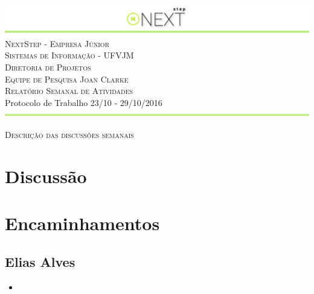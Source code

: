 \documentclass[a4paper, 12pt]{article}
\newcommand\semana{23/10 - 29/10/2016}
\newcommand\equipe{Equipe de Pesquisa Joan Clarke}
\newcommand\projeto{Relatório Semanal de Atividades}
\newcommand\titulo{Protocolo de Trabalho \semana}
\begin{document}
\begin{titlepage}

\begin{center}
\includegraphics[width=\linewidth]{../../images/next_step_logo.png} \\[0.8cm]
\textsc{\LARGE NextStep - Empresa Júnior} \\[0.2cm]
\textsc{\LARGE Sistemas de Informação - UFVJM} \\[0.2cm]
\textsc{\LARGE Diretoria de Projetos} \\[0.2cm]
\textsc{\equipe} \\[1.3cm]
\vfill
\textsc{\LARGE \projeto} \\[0.8cm]
\vfill
\vfill
{\LARGE \titulo \\[0.4cm]}
\includegraphics[width=\linewidth]{../../images/jc_rodape.png} \\[0.8cm]
\end{center}
\end{titlepage}
\clearpage

\begin{center}
\textsc{\LARGE Descrição das discussões semanais} \\[0.2cm]
\end{center}
\section*{Discussão}


\section*{Encaminhamentos}


\subsection*{Elias Alves}
\begin{itemize}
	\item 
\end{itemize}
\end{document}
